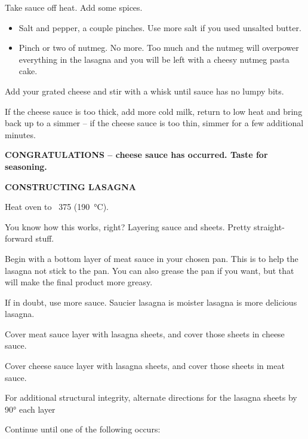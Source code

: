 \begin{recipe}
{		\vspace{1em}

		\step Take sauce off heat. Add some spices.

		\begin{itemize}
			\item Salt and pepper, a couple pinches. Use more salt if you used unsalted butter.

			\item Pinch or two of nutmeg. No more. Too much and the nutmeg will overpower everything in the lasagna and you will be left with a cheesy nutmeg pasta cake.
		\end{itemize}


		\step Add your grated cheese and stir with a whisk until sauce has no lumpy bits.

		\vspace{1em}

		\step If the cheese sauce is too thick, add more cold milk, return to low heat and bring back up to a simmer -- if the cheese sauce is too thin, simmer for a few additional minutes.

		\textbf{\large CONGRATULATIONS -- cheese sauce has occurred. Taste for seasoning.}

		\clearpage

		\textbf{\large CONSTRUCTING LASAGNA}

		\step Heat oven to ~\SI{375}{\fahrenheit} (\SI{190}{\celsius}).

		\vspace{1em}

		You know how this works, right? Layering sauce and sheets. Pretty straight-forward stuff.

		\step Begin with a bottom layer of meat sauce in your chosen pan. This is to help the lasagna not stick to the pan. You can also grease the pan if you want, but that will make the final product more greasy.

		\step If in doubt, use more sauce. Saucier lasagna is moister lasagna is more delicious lasagna.

		\step Cover meat sauce layer with lasagna sheets, and cover those sheets in cheese sauce.

		\step Cover cheese sauce layer with lasagna sheets, and cover those sheets in meat sauce.

		For additional structural integrity, alternate directions for the lasagna sheets by \ang{90} each layer

		\step Continue until one of the following occurs:

}
\end{recipe}
